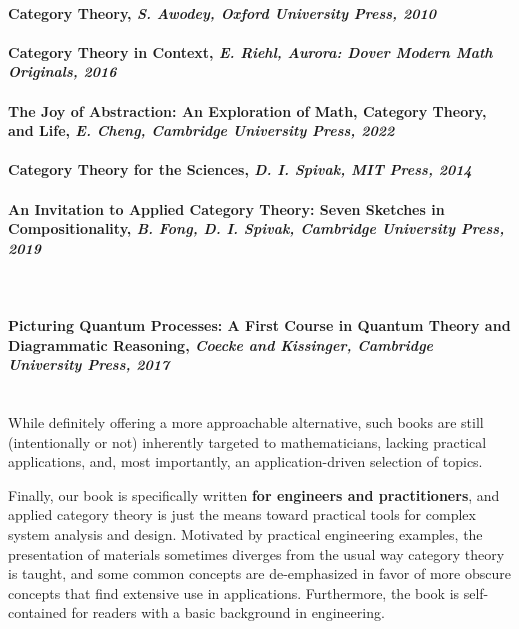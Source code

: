 \documentclass[10pt, article, one side]{memoir}
\begin{document}
\paragraph{Category Theory, \emph{S. Awodey, Oxford University Press, 2010}}

\paragraph{Category Theory in Context, \emph{E. Riehl, Aurora: Dover Modern Math Originals, 2016}}

\paragraph{The Joy of Abstraction: An Exploration of Math, Category Theory, and Life, \emph{E. Cheng, Cambridge University Press, 2022}}

\paragraph{Category Theory for the Sciences, \emph{D. I. Spivak, MIT Press, 2014}}

\paragraph{An Invitation to Applied Category Theory: Seven Sketches in Compositionality, \emph{B. Fong, D. I. Spivak, Cambridge University Press, 2019}
}





\
\\


\paragraph{Picturing Quantum Processes: A First Course in Quantum Theory and Diagrammatic Reasoning, \emph{Coecke and Kissinger, Cambridge University Press, 2017}}

\
\\




    While definitely offering a more approachable alternative, such books are still (intentionally or not) inherently targeted to mathematicians, lacking practical applications, and, most importantly, an application-driven selection of topics.

    Finally, our book is specifically written \textbf{for engineers and practitioners}, and applied category theory is just the means toward practical tools for complex system analysis and design.
    Motivated by practical engineering examples, the presentation of materials sometimes diverges from the usual way category theory is taught, and some common concepts are de-emphasized in favor of more obscure concepts that find extensive use in applications.
    Furthermore, the book is self-contained for readers with a basic background in engineering.
\end{document}
